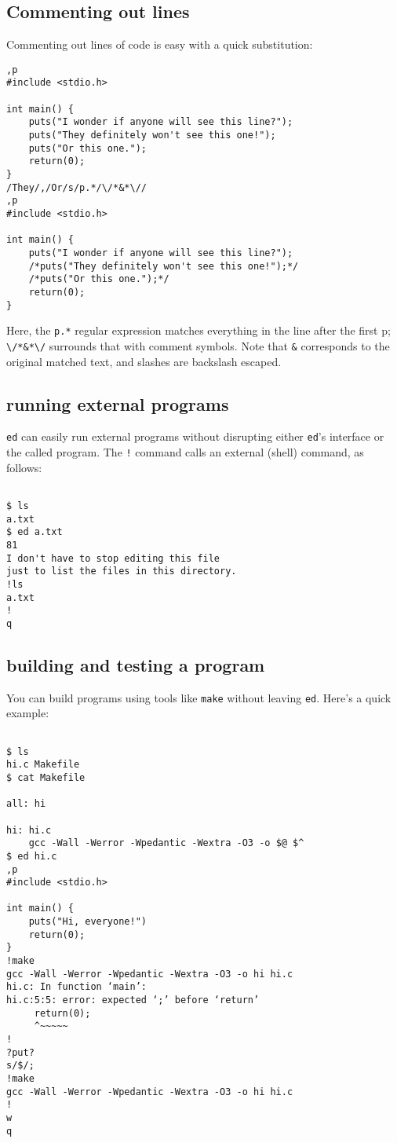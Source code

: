 \documentclass[12pt]{article}
\begin{document}
\subsection{Commenting out lines}

Commenting out lines of code is easy with a quick substitution:

\begin{lstlisting}
,p
#include <stdio.h>

int main() {
    puts("I wonder if anyone will see this line?");
    puts("They definitely won't see this one!");
    puts("Or this one.");
    return(0);
}
/They/,/Or/s/p.*/\/*&*\//
,p
#include <stdio.h>

int main() {
    puts("I wonder if anyone will see this line?");
    /*puts("They definitely won't see this one!");*/
    /*puts("Or this one.");*/
    return(0);
}
\end{lstlisting}

Here, the \lstinline{p.*} regular expression matches everything in the line after the first p; \lstinline{\/*&*\/}
surrounds that with comment symbols. Note that \lstinline{&} corresponds to the original matched text, and
slashes are backslash escaped.

\subsection{running external programs}

\lstinline{ed} can easily run external programs without disrupting either \lstinline{ed}'s
interface or the called program. The \lstinline{!} command calls an external (shell) command, as follows:

\begin{lstlisting}

$ ls
a.txt
$ ed a.txt
81
I don't have to stop editing this file
just to list the files in this directory.
!ls
a.txt
!
q
\end{lstlisting}

\subsection{building and testing a program}

You can build programs using tools like \lstinline{make} without leaving \lstinline{ed}. Here's a quick example:

\begin{lstlisting}

$ ls
hi.c Makefile
$ cat Makefile

all: hi

hi: hi.c
	gcc -Wall -Werror -Wpedantic -Wextra -O3 -o $@ $^
$ ed hi.c
,p
#include <stdio.h>

int main() {
    puts("Hi, everyone!")
    return(0);
}
!make
gcc -Wall -Werror -Wpedantic -Wextra -O3 -o hi hi.c
hi.c: In function ‘main’:
hi.c:5:5: error: expected ‘;’ before ‘return’
     return(0);
     ^~~~~~
!
?put?
s/$/;
!make
gcc -Wall -Werror -Wpedantic -Wextra -O3 -o hi hi.c
!
w
q
\end{lstlisting}
\end{document}
